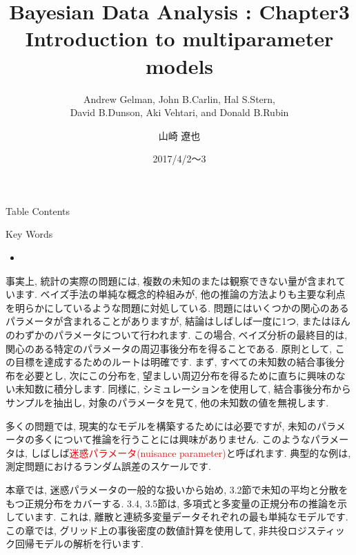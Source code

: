 \documentclass[10pt,dvipdfmx,a4]{beamer}
\title{Bayesian Data Analysis : Chapter3 \\Introduction to multiparameter models}
\subtitle{Andrew Gelman, John B.Carlin, Hal S.Stern,\\David B.Dunson, Aki Vehtari, and Donald B.Rubin}
\author{山崎 遼也}
\institute{情報学科 数理工学コース 4回}
\date{2017/4/2～3}
\newcommand{\tcr}[1]{\textcolor{red}{#1}}
\begin{document}
\frame{\titlepage}

\begin{frame}{Table Contents}
\begin{multicols}{2}
{\scriptsize \tableofcontents}
\end{multicols}
\end{frame}

\begin{frame}{Key Words}
\begin{multicols}{2}
{\scriptsize \begin{itemize}
\item 
\end{itemize}}
\end{multicols}
\end{frame}


\begin{frame}
事実上, 統計の実際の問題には, 複数の未知のまたは観察できない量が含まれています.
ベイズ手法の単純な概念的枠組みが, 他の推論の方法よりも主要な利点を明らかにしているような問題に対処している.
問題にはいくつかの関心のあるパラメータが含まれることがありますが, 結論はしばしば一度に1つ, またはほんのわずかのパラメータについて行われます.
この場合, ベイズ分析の最終目的は, 関心のある特定のパラメータの周辺事後分布を得ることである.
原則として, この目標を達成するためのルートは明確です.
まず, すべての未知数の結合事後分布を必要とし, 次にこの分布を, 望ましい周辺分布を得るために直ちに興味のない未知数に積分します.
同様に, シミュレーションを使用して, 結合事後分布からサンプルを抽出し, 対象のパラメータを見て, 他の未知数の値を無視します.
\end{frame}


\begin{frame}
多くの問題では, 現実的なモデルを構築するためには必要ですが, 未知のパラメータの多くについて推論を行うことには興味がありません.
このようなパラメータは, しばしば\tcr{迷惑パラメータ(nuisance parameter)}と呼ばれます.
典型的な例は, 測定問題におけるランダム誤差のスケールです.

本章では, 迷惑パラメータの一般的な扱いから始め, 3.2節で未知の平均と分散をもつ正規分布をカバーする.
3.4, 3.5節は, 多項式と多変量の正規分布の推論を示しています.
これは, 離散と連続多変量データそれぞれの最も単純なモデルです.
この章では, グリッド上の事後密度の数値計算を使用して, 非共役ロジスティック回帰モデルの解析を行います.
\end{frame}
\end{document}

